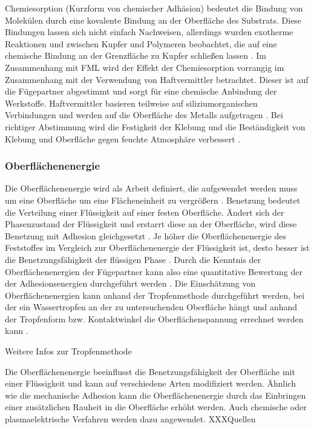 Chemiesorption (Kurzform von chemischer Adhäsion) bedeutet die Bindung von Molekülen durch eine kovalente Bindung an der Oberfläche des Substrats.
Diese Bindungen lassen sich nicht einfach Nachweisen, allerdings wurden exotherme Reaktionen und zwischen Kupfer und Polymeren beobachtet, die auf eine chemische Bindung an der Grenzfläche zu Kupfer schließen lassen \cite{Schroer.1994}.
Im Zusammenhang mit FML wird der Effekt der Chemiesorption vorrangig im Zusammenhang mit der Verwendung von Haftvermittler betrachtet.
Dieser ist auf die Fügepartner abgestimmt und sorgt für eine chemische Anbindung der Werkstoffe.
Haftvermittler basieren teilweise auf siliziumorganischen Verbindungen und werden auf die Oberfläche des Metalls aufgetragen \cite{Zucchi.2006}.
Bei richtiger Abstimmung wird die Festigkeit der Klebung und die Beständigkeit von Klebung und Oberfläche gegen feuchte Atmosphäre verbessert \cite{Habenicht.2009}.

\subsubsection{Oberflächenenergie}\label{sec:Eoberfläche}

Die Oberflächenenergie wird als Arbeit definiert, die aufgewendet werden muss um eine Oberfläche um eine Flächeneinheit zu vergrößern \cite{Flock.2012}.
Benetzung bedeutet die Verteilung einer Flüssigkeit auf einer festen Oberfläche.
Ändert sich der Phasenzustand der Flüssigkeit und erstarrt diese an der Oberfläche, wird diese Benetzung mit Adhesion gleichgesetzt \cite{Habenicht.2009}.
Je höher die Oberflächenenergie des Feststoffes im Vergleich zur Oberflächenenergie der Flüssigkeit ist, desto besser ist die Benetzungsfähigkeit der flüssigen Phase \cite{Flock.2012}.
Durch die Kenntnis der Oberflächenenergien der Fügepartner kann also eine quantitative Bewertung der der Adhesionsenergien durchgeführt werden \cite{Nikolova.2005}.
Die Einschätzung von Oberflächenenergien kann anhand der Tropfenmethode durchgeführt werden, bei der ein Wassertropfen an der zu untersuchenden Oberfläche hängt und anhand der Tropfenform bzw. Kontaktwinkel die Oberflächenspannung errechnet werden kann \cite{Flock.2012}.

Weitere Infos zur Tropfenmethode

Die Oberflächenenergie beeinflusst die Benetzungsfähigkeit der Oberfläche mit einer Flüssigkeit und kann auf verschiedene Arten modifiziert werden.
Ähnlich wie die mechanische Adhesion kann die Oberflächenenergie durch das Einbringen einer zusätzlichen Rauheit in die Oberfläche erhöht werden.
Auch chemische oder plasmaelektrische Verfahren werden dazu angewendet. XXXQuellen

